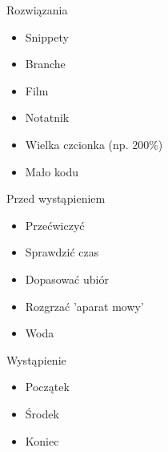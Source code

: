 \documentclass{beamer}
\begin{document}
\begin{frame}{}
	\begin{center}
		\Huge{Rozwiązania}
	\end{center}
\end{frame}

\begin{frame}{}
	\begin{Large}
		\begin{itemize}
			\item Snippety
			\item Branche
			\item Film
			\item Notatnik
			\item Wielka czcionka (np. 200\%)
			\item Mało kodu
		\end{itemize}
	\end{Large}
\end{frame}

\begin{frame}{}
	\begin{center}
		\Huge{Przed wystąpieniem}
	\end{center}
\end{frame}

\begin{frame}{}
	\begin{Large}
		\begin{itemize}
			\item Przećwiczyć
			\item Sprawdzić czas
			\item Dopasować ubiór
			\item Rozgrzać 'aparat mowy'
			\item Woda
		\end{itemize}
	\end{Large}
\end{frame}

\begin{frame}{}
	\begin{center}
		\Huge{Wystąpienie}
	\end{center}
\end{frame}

\begin{frame}{}
	\begin{Large}
		\begin{itemize}
			\item Początek
			\item Środek
			\item Koniec
		\end{itemize}
	\end{Large}
\end{frame}
\end{document}
